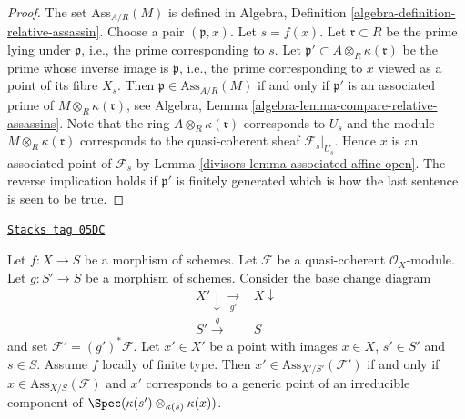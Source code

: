 \begin{proof}

The set $\text{Ass}_{A/R}(M)$ is defined in
Algebra, Definition \ref{algebra-definition-relative-assassin}.
Choose a pair $(\mathfrak p, x)$. Let $s = f(x)$.
Let $\mathfrak r \subset R$ be the prime lying under $\mathfrak p$,
i.e., the prime corresponding to $s$.
Let $\mathfrak p' \subset A \otimes_R \kappa(\mathfrak r)$
be the prime whose inverse image is $\mathfrak p$, i.e.,
the prime corresponding to $x$ viewed as a point of its fibre $X_s$.
Then $\mathfrak p \in \text{Ass}_{A/R}(M)$ if and only if
$\mathfrak p'$ is an associated prime of
$M \otimes_R \kappa(\mathfrak r)$, see
Algebra, Lemma \ref{algebra-lemma-compare-relative-assassins}.
Note that the ring $A \otimes_R \kappa(\mathfrak r)$ corresponds to $U_s$
and the module $M \otimes_R \kappa(\mathfrak r)$ corresponds to the
quasi-coherent sheaf $\mathcal{F}_s|_{U_s}$.
Hence $x$ is an associated point of $\mathcal{F}_s$
by Lemma \ref{divisors-lemma-associated-affine-open}.
The reverse implication holds if $\mathfrak p'$ is finitely generated
which is how the last sentence is seen to be true.
\end{proof}

\begin{lemma}
\label{divisors-lemma-base-change-relative-assassin}
\href{https://stacks.math.columbia.edu/tag/05DC}{\texttt{Stacks tag 05DC}}

Let $f : X \to S$ be a morphism of schemes.
Let $\mathcal{F}$ be a quasi-coherent $\mathcal{O}_X$-module.
Let $g : S' \to S$ be a morphism of schemes.
Consider the base change diagram
$$
\begin{array}{cc}X' \downarrow\underset{g'}{\longrightarrow} & X \downarrow \\ S' \overset{g}{\longrightarrow} & S\end{array}
$$
and set $\mathcal{F}' = (g')^*\mathcal{F}$. Let $x' \in X'$ be a point
with images $x \in X$, $s' \in S'$ and $s \in S$.
Assume $f$ locally of finite type.
Then $x' \in \text{Ass}_{X'/S'}(\mathcal{F}')$ if and only if
$x \in \text{Ass}_{X/S}(\mathcal{F})$ and $x'$ corresponds to
a generic point of an irreducible component of
$\Spec(\kappa(s') \otimes_{\kappa(s)} \kappa(x))$.
\end{lemma}

